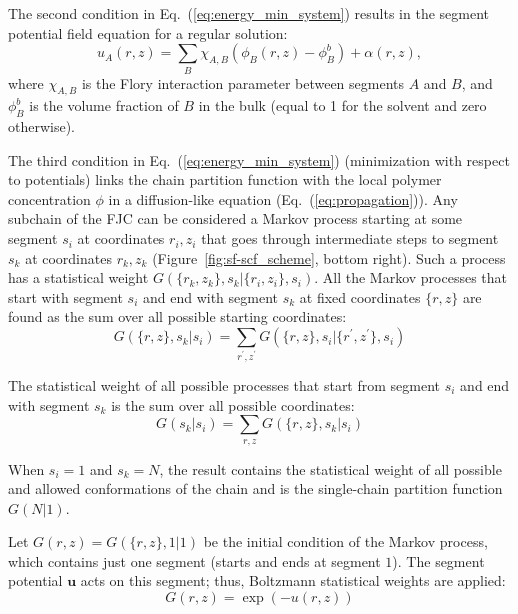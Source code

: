 \documentclass[10pt, a4paper]{article}
\begin{document}
\begin{multicols}{2}
The second condition in Eq.~(\ref{eq:energy_min_system}) results in the segment potential field equation for a regular solution:
\begin{equation}
    \label{eq:u-phi}
    u_A(r, z) =\sum\limits_{B} \chi_{A,B} \left(\phi_B(r,z) - \phi_B^b \right) + \alpha(r, z),
\end{equation}
where $\chi_{A,B}$ is the Flory interaction parameter between segments $A$ and $B$, and $\phi_B^b$ is the volume fraction of $B$ in the bulk (equal to 1 for the solvent and zero otherwise).

The third condition in Eq.~(\ref{eq:energy_min_system}) (minimization with respect to potentials) links the chain partition function with the local polymer concentration $\phi$ in a diffusion-like equation (Eq.~(\ref{eq:propagation})).
Any subchain of the FJC can be considered a Markov process starting at some segment $s_i$ at coordinates $r_i, z_i$ that goes through intermediate steps to segment $s_k$ at coordinates $r_k, z_k$ (Figure~\ref{fig:sf-scf_scheme}, bottom right).
Such a process has a statistical weight $G(\{r_k, z_k\}, s_k | \{r_i, z_i\}, s_i)$.
All the Markov processes that start with segment $s_i$ and end with segment $s_k$ at fixed coordinates $\{r, z\}$ are found as the sum over all possible starting coordinates:
\begin{equation}
    \label{eq:sum_to_phi}
    G(\{r, z\}, s_k | s_i) = \sum_{r^{\prime}, z^{\prime}} G(\{r, z\}, s_i | \{r^{\prime}, z^{\prime}\}, s_i)
\end{equation}


The statistical weight of all possible processes that start from segment $s_i$ and end with segment $s_k$ is the sum over all possible coordinates:
\begin{equation}
    G(s_k | s_i) = \sum_{r, z} G(\{r, z\}, s_k | s_i)
\end{equation}

When $s_i=1$ and $s_k=N$, the result contains the statistical weight of all possible and allowed conformations of the chain and is the single-chain partition function $G(N|1)$.

Let $G(r, z) = G(\{r, z\}, 1|1)$ be the initial condition of the Markov process, which contains just one segment (starts and ends at segment $1$).
The segment potential $\bm{u}$ acts on this segment; thus, Boltzmann statistical weights are applied:
\begin{equation}
    G(r, z) = \exp(-u(r,z))
\end{equation}


\end{multicols}
\end{document}
